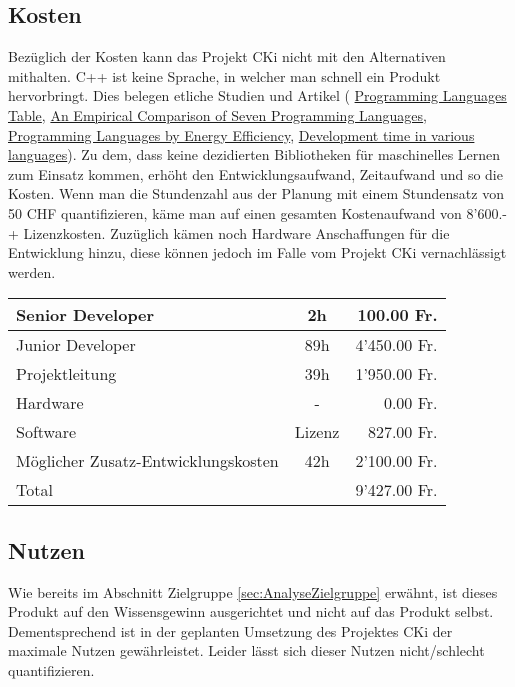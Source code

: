 \subsection{Kosten}
\label{sec:AnalyseKosten}
Bezüglich der Kosten kann das Projekt CKi nicht mit den Alternativen mithalten. C++ ist keine Sprache, in welcher man schnell ein Produkt hervorbringt. Dies belegen etliche Studien und Artikel (
\href{https://www.cs.bsu.edu/homepages/dmz/cs697/langtbl.htm}{Programming Languages Table}, 
\href{https://citeseerx.ist.psu.edu/viewdoc/download?doi=10.1.1.113.1831&rep=rep1&type=pdf}{An Empirical Comparison of Seven Programming Languages},
\href{https://haslab.github.io/SAFER/scp21.pdf}{Programming Languages by Energy Efficiency}, 
\href{https://stackoverflow.com/questions/1894453/development-time-in-various-languages}{Development time in various languages}).
Zu dem, dass keine dezidierten Bibliotheken für maschinelles Lernen zum Einsatz kommen, erhöht den Entwicklungsaufwand, Zeitaufwand und so die Kosten.
Wenn man die Stundenzahl aus der Planung mit einem Stundensatz von 50 CHF quantifizieren, käme man auf einen gesamten Kostenaufwand von 8'600.- + Lizenzkosten. Zuzüglich kämen noch Hardware Anschaffungen für die Entwicklung hinzu, diese können jedoch im Falle vom Projekt CKi vernachlässigt werden.  

\begin{xltabular}{\linewidth}{|X|c|r|}
	\hline
	Senior Developer & 2h & 100.00 Fr.
	\\\hline
	Junior Developer & 89h & 4'450.00 Fr.
	\\\hline
	Projektleitung & 39h & 1'950.00 Fr.
	\\\hline
	Hardware & - & 0.00 Fr.
	\\\hline
	Software & Lizenz & 827.00 Fr.
	\\\hline\hline
	Möglicher Zusatz-Entwicklungskosten  & 42h & 2'100.00 Fr.
	\\\hline\hline
	Total &  & 9'427.00 Fr.
	\\\hline
\end{xltabular}
\label{tab:AnalyseKostenTable}

\subsection{Nutzen}
\label{sec:AnalyseNutzen}
Wie bereits im Abschnitt Zielgruppe \ref{sec:AnalyseZielgruppe} erwähnt, ist dieses Produkt auf den Wissensgewinn ausgerichtet und nicht auf das Produkt selbst. Dementsprechend ist in der geplanten Umsetzung des Projektes CKi der maximale Nutzen gewährleistet. Leider lässt sich dieser Nutzen nicht/schlecht quantifizieren.

